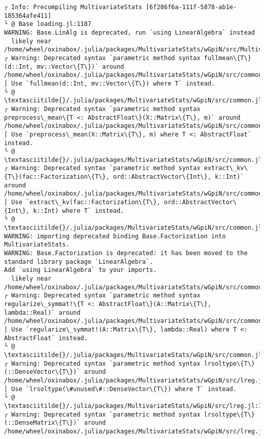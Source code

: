 \documentclass[11pt]{article}
\begin{document}
    \begin{Verbatim}[commandchars=\\\{\}]
┌ Info: Precompiling MultivariateStats [6f286f6a-111f-5878-ab1e-185364afe411]
└ @ Base loading.jl:1187
WARNING: Base.LinAlg is deprecated, run `using LinearAlgebra` instead
  likely near /home/wheel/oxinabox/.julia/packages/MultivariateStats/wGpiN/src/MultivariateStats.jl:8
┌ Warning: Deprecated syntax `parametric method syntax fullmean\{T\}(d::Int, mv::Vector\{T\})` around /home/wheel/oxinabox/.julia/packages/MultivariateStats/wGpiN/src/common.jl:23.
│ Use `fullmean(d::Int, mv::Vector\{T\}) where T` instead.
└ @ \textasciitilde{}/.julia/packages/MultivariateStats/wGpiN/src/common.jl:23
┌ Warning: Deprecated syntax `parametric method syntax preprocess\_mean\{T <: AbstractFloat\}(X::Matrix\{T\}, m)` around /home/wheel/oxinabox/.julia/packages/MultivariateStats/wGpiN/src/common.jl:25.
│ Use `preprocess\_mean(X::Matrix\{T\}, m) where T <: AbstractFloat` instead.
└ @ \textasciitilde{}/.julia/packages/MultivariateStats/wGpiN/src/common.jl:25
┌ Warning: Deprecated syntax `parametric method syntax extract\_kv\{T\}(fac::Factorization\{T\}, ord::AbstractVector\{Int\}, k::Int)` around /home/wheel/oxinabox/.julia/packages/MultivariateStats/wGpiN/src/common.jl:34.
│ Use `extract\_kv(fac::Factorization\{T\}, ord::AbstractVector\{Int\}, k::Int) where T` instead.
└ @ \textasciitilde{}/.julia/packages/MultivariateStats/wGpiN/src/common.jl:34
WARNING: importing deprecated binding Base.Factorization into MultivariateStats.
WARNING: Base.Factorization is deprecated: it has been moved to the standard library package `LinearAlgebra`.
Add `using LinearAlgebra` to your imports.
  likely near /home/wheel/oxinabox/.julia/packages/MultivariateStats/wGpiN/src/common.jl:33
┌ Warning: Deprecated syntax `parametric method syntax regularize\_symmat!\{T <: AbstractFloat\}(A::Matrix\{T\}, lambda::Real)` around /home/wheel/oxinabox/.julia/packages/MultivariateStats/wGpiN/src/common.jl:102.
│ Use `regularize\_symmat!(A::Matrix\{T\}, lambda::Real) where T <: AbstractFloat` instead.
└ @ \textasciitilde{}/.julia/packages/MultivariateStats/wGpiN/src/common.jl:102
┌ Warning: Deprecated syntax `parametric method syntax lrsoltype\{T\}(::DenseVector\{T\})` around /home/wheel/oxinabox/.julia/packages/MultivariateStats/wGpiN/src/lreg.jl:13.
│ Use `lrsoltype(\#unused\#::DenseVector\{T\}) where T` instead.
└ @ \textasciitilde{}/.julia/packages/MultivariateStats/wGpiN/src/lreg.jl:13
┌ Warning: Deprecated syntax `parametric method syntax lrsoltype\{T\}(::DenseMatrix\{T\})` around /home/wheel/oxinabox/.julia/packages/MultivariateStats/wGpiN/src/lreg.jl:14.

\end{Verbatim}
\end{document}
